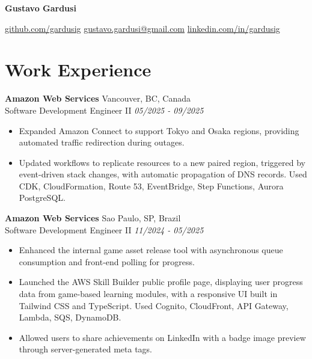 \documentclass[a4paper,10pt]{article}
\begin{document}
\begin{center}
    {\LARGE \textbf{Gustavo Gardusi}} \\[1.00em]
    {\small
        \begin{minipage}{0.75\textwidth}
        \href{https://github.com/gardusig}{github.com/gardusig} \hfill
        \href{mailto:gustavo.gardusi@gmail.com}{gustavo.gardusi@gmail.com} \hfill
        \href{https://www.linkedin.com/in/gardusig}{linkedin.com/in/gardusig}
    \end{minipage}}
\end{center}

\section*{Work Experience}

\textbf{Amazon Web Services}
    \hfill Vancouver, BC, Canada
    \\ Software Development Engineer II
    \hfill \textit{05/2025 - 09/2025}
\begin{itemize}
    \item Expanded Amazon Connect to support Tokyo and Osaka regions, providing automated traffic redirection during outages.
    \item Updated workflows to replicate resources to a new paired region, triggered by event-driven stack changes, with automatic propagation of DNS records. Used CDK, CloudFormation, Route 53, EventBridge, Step Functions, Aurora PostgreSQL.
\end{itemize}

\textbf{Amazon Web Services}
    \hfill Sao Paulo, SP, Brazil 
    \\ Software Development Engineer II
    \hfill \textit{11/2024 - 05/2025}
\begin{itemize}
    \item Enhanced the internal game asset release tool with asynchronous queue consumption and front-end polling for progress.
    \item Launched the AWS Skill Builder public profile page, displaying user progress data from game-based learning modules, with a responsive UI built in Tailwind CSS and TypeScript. Used Cognito, CloudFront, API Gateway, Lambda, SQS, DynamoDB.
    \item Allowed users to share achievements on LinkedIn with a badge image preview through server-generated meta tags.
\end{itemize}
\end{document}
